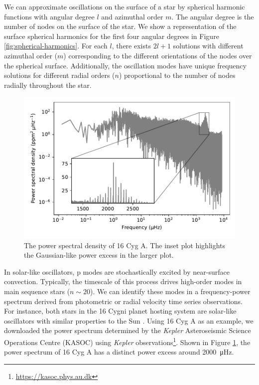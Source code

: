 We can approximate oscillations on the surface of a star by spherical harmonic functions with angular degree \(l\) and azimuthal order \(m\). The angular degree is the number of nodes on the surface of the star. We show a representation of the surface spherical harmonics for the first four angular degrees in Figure \ref{fig:spherical-harmonics}. For each \(l\), there exists \(2l+1\) solutions with different azimuthal order (\(m\)) corresponding to the different orientations of the nodes over the spherical surface. Additionally, the oscillation modes have unique frequency solutions for different radial orders (\(n\)) proportional to the number of nodes radially throughout the star.

\begin{figure}[tb]
    \centering
    \includegraphics{figures/seismo-psd.pdf}
    \caption[The power spectral density of 16 Cyg A.]{The power spectral density of 16 Cyg A. The inset plot highlights the Gaussian-like power excess in the larger plot.}
    \label{fig:seismo-psd}
\end{figure}

In solar-like oscillators, p modes are stochastically excited by near-surface convection. Typically, the timescale of this process drives high-order modes in main sequence stars (\(n \sim 20\)). We can identify these modes in a frequency-power spectrum derived from photometric or radial velocity time series observations. For instance, both stars in the 16 Cygni planet hosting system are solar-like oscillators with similar properties to the Sun \citep{Metcalfe.Chaplin.ea2012,Davies.Chaplin.ea2015,Metcalfe.Creevey.ea2014}. Using 16 Cyg A as an example, we downloaded the power spectrum determined by the \emph{Kepler} Asteroseismic Science Operations Centre (KASOC) using \emph{Kepler} observations\footnote{\url{https://kasoc.phys.au.dk}}. Shown in Figure \ref{fig:seismo-psd}, the power spectrum of 16 Cyg A has a distinct power excess around \SI{2000}{\micro\hertz}. 

